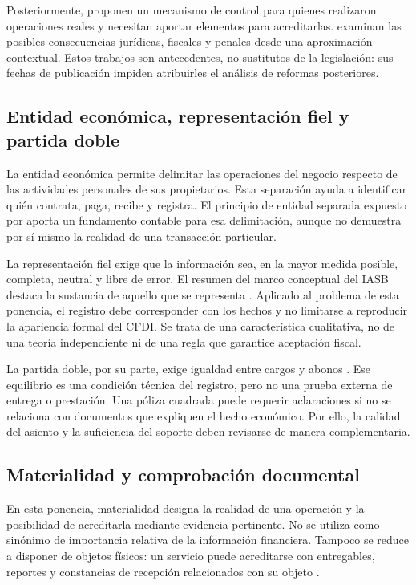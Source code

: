 Posteriormente, \textcite{rico2023mecanismo} proponen un mecanismo de control
para quienes realizaron operaciones reales y necesitan aportar elementos
para acreditarlas. \textcite{rico2024consecuencias} examinan las posibles
consecuencias jurídicas, fiscales y penales desde una aproximación contextual.
Estos trabajos son antecedentes, no sustitutos de la legislación: sus fechas
de publicación impiden atribuirles el análisis de reformas posteriores.

\subsection{Entidad económica, representación fiel y partida doble}

La entidad económica permite delimitar las operaciones del negocio respecto
de las actividades personales de sus propietarios. Esta separación ayuda a
identificar quién contrata, paga, recibe y registra. El principio de entidad
separada expuesto por \textcite[cap. 3]{openstax2019} aporta un fundamento
contable para esa delimitación, aunque no demuestra por sí mismo la realidad
de una transacción particular.

La representación fiel exige que la información sea, en la mayor medida
posible, completa, neutral y libre de error. El resumen del marco conceptual
del IASB destaca la sustancia de aquello que se representa
\parencite[cap. 2]{ifrs2018}. Aplicado al problema de esta ponencia, el
registro debe corresponder con los hechos y no limitarse a reproducir la
apariencia formal del CFDI. Se trata de una característica cualitativa, no de
una teoría independiente ni de una regla que garantice aceptación fiscal.

La partida doble, por su parte, exige igualdad entre cargos y abonos
\parencite[cap. 3]{openstax2019}. Ese equilibrio es una condición técnica del
registro, pero no una prueba externa de entrega o prestación. Una póliza
cuadrada puede requerir aclaraciones si no se relaciona con documentos que
expliquen el hecho económico. Por ello, la calidad del asiento y la suficiencia
del soporte deben revisarse de manera complementaria.

\subsection{Materialidad y comprobación documental}

En esta ponencia, materialidad designa la realidad de una operación y la
posibilidad de acreditarla mediante evidencia pertinente. No se utiliza como
sinónimo de importancia relativa de la información financiera. Tampoco se
reduce a disponer de objetos físicos: un servicio puede acreditarse con
entregables, reportes y constancias de recepción relacionados con su objeto
\parencite{rico2023mecanismo}.

